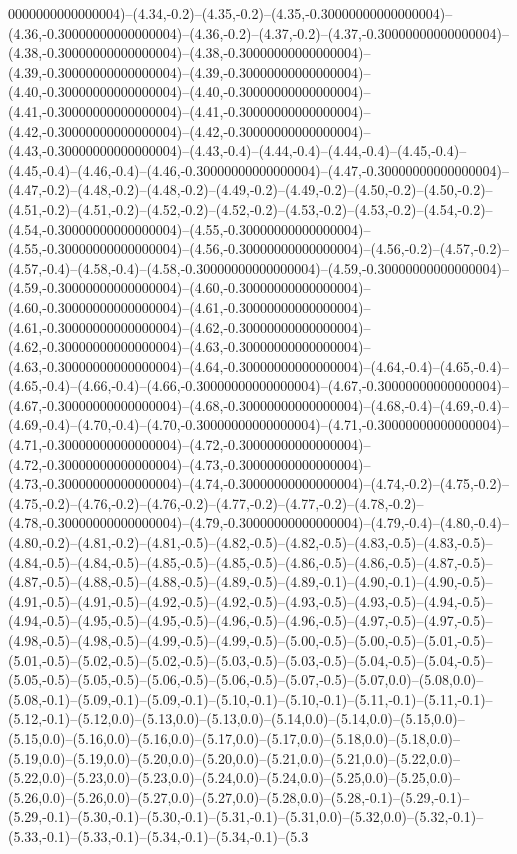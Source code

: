 0000000000000004)--(4.34,-0.2)--(4.35,-0.2)--(4.35,-0.30000000000000004)--(4.36,-0.30000000000000004)--(4.36,-0.2)--(4.37,-0.2)--(4.37,-0.30000000000000004)--(4.38,-0.30000000000000004)--(4.38,-0.30000000000000004)--(4.39,-0.30000000000000004)--(4.39,-0.30000000000000004)--(4.40,-0.30000000000000004)--(4.40,-0.30000000000000004)--(4.41,-0.30000000000000004)--(4.41,-0.30000000000000004)--(4.42,-0.30000000000000004)--(4.42,-0.30000000000000004)--(4.43,-0.30000000000000004)--(4.43,-0.4)--(4.44,-0.4)--(4.44,-0.4)--(4.45,-0.4)--(4.45,-0.4)--(4.46,-0.4)--(4.46,-0.30000000000000004)--(4.47,-0.30000000000000004)--(4.47,-0.2)--(4.48,-0.2)--(4.48,-0.2)--(4.49,-0.2)--(4.49,-0.2)--(4.50,-0.2)--(4.50,-0.2)--(4.51,-0.2)--(4.51,-0.2)--(4.52,-0.2)--(4.52,-0.2)--(4.53,-0.2)--(4.53,-0.2)--(4.54,-0.2)--(4.54,-0.30000000000000004)--(4.55,-0.30000000000000004)--(4.55,-0.30000000000000004)--(4.56,-0.30000000000000004)--(4.56,-0.2)--(4.57,-0.2)--(4.57,-0.4)--(4.58,-0.4)--(4.58,-0.30000000000000004)--(4.59,-0.30000000000000004)--(4.59,-0.30000000000000004)--(4.60,-0.30000000000000004)--(4.60,-0.30000000000000004)--(4.61,-0.30000000000000004)--(4.61,-0.30000000000000004)--(4.62,-0.30000000000000004)--(4.62,-0.30000000000000004)--(4.63,-0.30000000000000004)--(4.63,-0.30000000000000004)--(4.64,-0.30000000000000004)--(4.64,-0.4)--(4.65,-0.4)--(4.65,-0.4)--(4.66,-0.4)--(4.66,-0.30000000000000004)--(4.67,-0.30000000000000004)--(4.67,-0.30000000000000004)--(4.68,-0.30000000000000004)--(4.68,-0.4)--(4.69,-0.4)--(4.69,-0.4)--(4.70,-0.4)--(4.70,-0.30000000000000004)--(4.71,-0.30000000000000004)--(4.71,-0.30000000000000004)--(4.72,-0.30000000000000004)--(4.72,-0.30000000000000004)--(4.73,-0.30000000000000004)--(4.73,-0.30000000000000004)--(4.74,-0.30000000000000004)--(4.74,-0.2)--(4.75,-0.2)--(4.75,-0.2)--(4.76,-0.2)--(4.76,-0.2)--(4.77,-0.2)--(4.77,-0.2)--(4.78,-0.2)--(4.78,-0.30000000000000004)--(4.79,-0.30000000000000004)--(4.79,-0.4)--(4.80,-0.4)--(4.80,-0.2)--(4.81,-0.2)--(4.81,-0.5)--(4.82,-0.5)--(4.82,-0.5)--(4.83,-0.5)--(4.83,-0.5)--(4.84,-0.5)--(4.84,-0.5)--(4.85,-0.5)--(4.85,-0.5)--(4.86,-0.5)--(4.86,-0.5)--(4.87,-0.5)--(4.87,-0.5)--(4.88,-0.5)--(4.88,-0.5)--(4.89,-0.5)--(4.89,-0.1)--(4.90,-0.1)--(4.90,-0.5)--(4.91,-0.5)--(4.91,-0.5)--(4.92,-0.5)--(4.92,-0.5)--(4.93,-0.5)--(4.93,-0.5)--(4.94,-0.5)--(4.94,-0.5)--(4.95,-0.5)--(4.95,-0.5)--(4.96,-0.5)--(4.96,-0.5)--(4.97,-0.5)--(4.97,-0.5)--(4.98,-0.5)--(4.98,-0.5)--(4.99,-0.5)--(4.99,-0.5)--(5.00,-0.5)--(5.00,-0.5)--(5.01,-0.5)--(5.01,-0.5)--(5.02,-0.5)--(5.02,-0.5)--(5.03,-0.5)--(5.03,-0.5)--(5.04,-0.5)--(5.04,-0.5)--(5.05,-0.5)--(5.05,-0.5)--(5.06,-0.5)--(5.06,-0.5)--(5.07,-0.5)--(5.07,0.0)--(5.08,0.0)--(5.08,-0.1)--(5.09,-0.1)--(5.09,-0.1)--(5.10,-0.1)--(5.10,-0.1)--(5.11,-0.1)--(5.11,-0.1)--(5.12,-0.1)--(5.12,0.0)--(5.13,0.0)--(5.13,0.0)--(5.14,0.0)--(5.14,0.0)--(5.15,0.0)--(5.15,0.0)--(5.16,0.0)--(5.16,0.0)--(5.17,0.0)--(5.17,0.0)--(5.18,0.0)--(5.18,0.0)--(5.19,0.0)--(5.19,0.0)--(5.20,0.0)--(5.20,0.0)--(5.21,0.0)--(5.21,0.0)--(5.22,0.0)--(5.22,0.0)--(5.23,0.0)--(5.23,0.0)--(5.24,0.0)--(5.24,0.0)--(5.25,0.0)--(5.25,0.0)--(5.26,0.0)--(5.26,0.0)--(5.27,0.0)--(5.27,0.0)--(5.28,0.0)--(5.28,-0.1)--(5.29,-0.1)--(5.29,-0.1)--(5.30,-0.1)--(5.30,-0.1)--(5.31,-0.1)--(5.31,0.0)--(5.32,0.0)--(5.32,-0.1)--(5.33,-0.1)--(5.33,-0.1)--(5.34,-0.1)--(5.34,-0.1)--(5.3